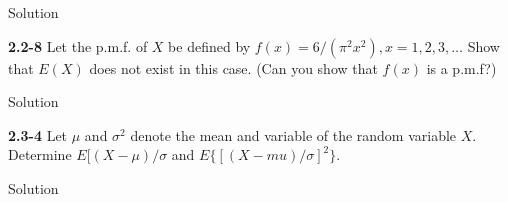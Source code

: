 \documentclass{article}
\begin{document}
\begin{spacing}{1.1}
\begin{homeworkProblem}
\begin{homeworkSection}{Solution}
	\end{homeworkSection}
\end{homeworkProblem}
\begin{homeworkProblem}
	{\bf 2.2-8}	Let the p.m.f. of $X$ be defined by $f(x) = 6/(\pi^2 x^2), x = 1, 2, 3, \dots$ Show that $E(X)$ does not exist in this case.  (Can you show that $f(x)$ is a p.m.f?)
	\begin{homeworkSection}{Solution}
		
	\end{homeworkSection}
\end{homeworkProblem}
\begin{homeworkProblem}
	{\bf 2.3-4}	 Let $\mu$ and $\sigma^2$ denote the mean and variable of the random variable $X$.  Determine $E[(X - \mu)/ \sigma$ and $E\{[ (X - mu)/\sigma]^2\}$.  
	\begin{homeworkSection}{Solution}
		
	\end{homeworkSection}
\end{homeworkProblem}


\begin{comment}%
\begin{homeworkProblem}
	
	\begin{homeworkSection}{Solution}
		
	\end{homeworkSection}
\end{homeworkProblem}
\begin{homeworkProblem}
	
	\begin{enumerate}[(a)]
		\item 
			\begin{homeworkSection}{Solution}
		
			\end{homeworkSection}
	\end{enumerate}
\end{homeworkProblem}
\begin{homeworkProblem}
	{\bf }	
	\begin{homeworkSection}{Solution}
		

\end{comment}
\end{spacing}
\end{document}
